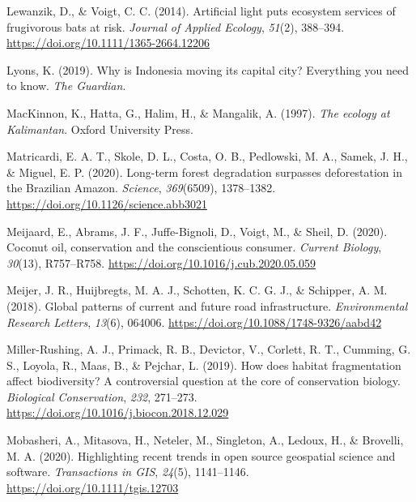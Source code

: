 \documentclass[
  letterpaper,
  DIV=11,
  numbers=noendperiod]{scrreprt}
\newlength{\cslhangindent}
\newlength{\cslentryspacingunit} %
\newenvironment{CSLReferences}[2] %
 {%
  \setlength{\parindent}{0pt}
  \ifodd #1
  \let\oldpar\par
  \def\par{\hangindent=\cslhangindent\oldpar}
  \fi
  \setlength{\parskip}{#2\cslentryspacingunit}
 }%
 {}
\begin{document}
\begin{CSLReferences}{1}{0}
\leavevmode{}%
Lewanzik, D., \& Voigt, C. C. (2014). Artificial light puts ecosystem
services of frugivorous bats at risk. \emph{Journal of Applied Ecology},
\emph{51}(2), 388--394. \url{https://doi.org/10.1111/1365-2664.12206}

\leavevmode{}%
Lyons, K. (2019). Why is {Indonesia} moving its capital city?
{Everything} you need to know. \emph{The Guardian}.

\leavevmode{}%
MacKinnon, K., Hatta, G., Halim, H., \& Mangalik, A. (1997). \emph{The
ecology at {Kalimantan}}. {Oxford University Press}.

\leavevmode{}%
Matricardi, E. A. T., Skole, D. L., Costa, O. B., Pedlowski, M. A.,
Samek, J. H., \& Miguel, E. P. (2020). Long-term forest degradation
surpasses deforestation in the {Brazilian Amazon}. \emph{Science},
\emph{369}(6509), 1378--1382.
\url{https://doi.org/10.1126/science.abb3021}

\leavevmode{}%
Meijaard, E., Abrams, J. F., Juffe-Bignoli, D., Voigt, M., \& Sheil, D.
(2020). Coconut oil, conservation and the conscientious consumer.
\emph{Current Biology}, \emph{30}(13), R757--R758.
\url{https://doi.org/10.1016/j.cub.2020.05.059}

\leavevmode{}%
Meijer, J. R., Huijbregts, M. A. J., Schotten, K. C. G. J., \& Schipper,
A. M. (2018). Global patterns of current and future road infrastructure.
\emph{Environmental Research Letters}, \emph{13}(6), 064006.
\url{https://doi.org/10.1088/1748-9326/aabd42}

\leavevmode{}%
Miller-Rushing, A. J., Primack, R. B., Devictor, V., Corlett, R. T.,
Cumming, G. S., Loyola, R., Maas, B., \& Pejchar, L. (2019). How does
habitat fragmentation affect biodiversity? {A} controversial question at
the core of conservation biology. \emph{Biological Conservation},
\emph{232}, 271--273. \url{https://doi.org/10.1016/j.biocon.2018.12.029}

\leavevmode{}%
Mobasheri, A., Mitasova, H., Neteler, M., Singleton, A., Ledoux, H., \&
Brovelli, M. A. (2020). Highlighting recent trends in open source
geospatial science and software. \emph{Transactions in GIS},
\emph{24}(5), 1141--1146. \url{https://doi.org/10.1111/tgis.12703}


\end{CSLReferences}
\end{document}
